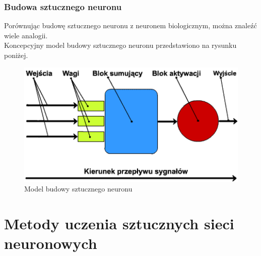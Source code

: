 \newpage
\subsubsection{Budowa sztucznego neuronu}
Porównując budowę sztucznego neuronu z neuronem biologicznym, można znaleźć wiele analogii. \\
Koncepcyjny model budowy sztucznego neuronu przedstawiono na rysunku poniżej.

\vspace{1cm}
\begin{figure}[h]
\begin{center}
\includegraphics[width=15cm]{resources/figures/artificial_neuron.png}
\caption{Model budowy sztucznego neuronu}
\end{center}
\end{figure}
\newpage

\section{Metody uczenia sztucznych sieci neuronowych}